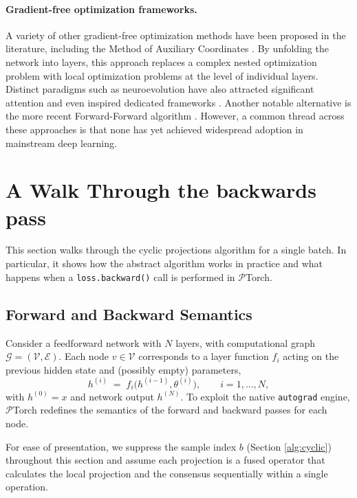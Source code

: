 \documentclass{article}
\begin{document}
\paragraph{Gradient-free optimization frameworks.}
A variety of other gradient-free optimization methods have been proposed in the literature, including the Method of Auxiliary Coordinates \cite{carreira2014distributed}. By unfolding the network into layers, this approach replaces a complex nested optimization problem with local optimization problems at the level of individual layers. Distinct paradigms such as neuroevolution have also attracted significant attention and even inspired dedicated frameworks \cite{tang2022evojax}. Another notable alternative is the more recent Forward-Forward algorithm \cite{hinton2022forward}. However, a common thread across these approaches is that none has yet achieved widespread adoption in mainstream deep learning.

\section{A Walk Through the backwards pass}
\label{app:walk-through}

This section walks through the cyclic projections algorithm for a single batch. In particular, it shows how the abstract algorithm works in practice and what happens when a \texttt{loss.backward()} call is performed in $\mathcal{P}$Torch.
 
\subsection{Forward and Backward Semantics}
Consider a feedforward network with $N$ layers, with computational graph $\mathcal{G} = (\mathcal{V}, \mathcal{E})$. Each node $v \in \mathcal{V}$ corresponds to a layer function $f_i$ acting on the previous hidden state and (possibly empty) parameters,
\begin{equation}
h^{(i)} \;=\; f_i\bigl(h^{(i-1)}, \theta^{(i)}\bigr), \qquad i = 1, \dots, N,
\end{equation}
with $h^{(0)} = x$ and network output $h^{(N)}$. To exploit the native \texttt{autograd} engine, $\mathcal{P}$Torch redefines the semantics of the forward and backward passes for each node.

For ease of presentation, we suppress the sample index $b$ (Section \ref{alg:cyclic}) throughout this section and assume each projection is a fused operator that calculates the local projection and the consensus sequentially within a single operation.
\end{document}
